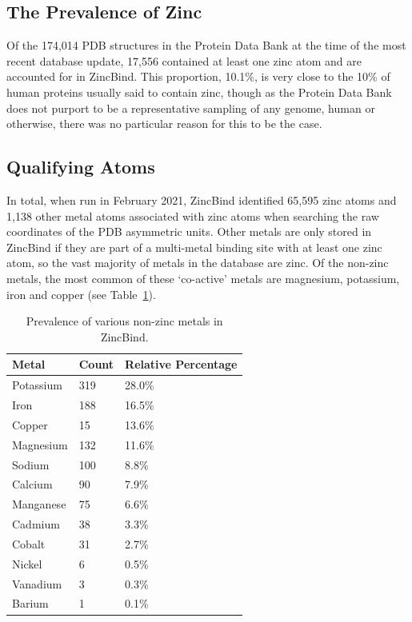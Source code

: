 \subsection{The Prevalence of Zinc}

Of the 174,014 PDB structures in the Protein Data Bank at the time of the most recent database update, 17,556 contained at least one zinc atom and are accounted for in ZincBind. This proportion, 10.1\%, is very close to the 10\% of human proteins usually said to contain zinc, though as the Protein Data Bank does not purport to be a representative sampling of any genome, human or otherwise, there was no particular reason for this to be the case.

\subsection{Qualifying Atoms}

In total, when run in February 2021, ZincBind identified 65,595 zinc atoms and 1,138 other metal atoms associated with zinc atoms when searching the raw coordinates of the PDB asymmetric units. Other metals are only stored in ZincBind if they are part of a multi-metal binding site with at least one zinc atom, so the vast majority of metals in the database are zinc. Of the non-zinc metals, the most common of these `co-active' metals are magnesium, potassium, iron and copper (see Table~\ref{tab:metalcount}).

\begin{table}
  \caption{\label{tab:metalcount}Prevalence of various non-zinc metals in ZincBind.}
\begin{center}
\begin{tabular}{lll} \hline
Metal & Count & Relative Percentage  \\ \hline
Potassium & 319   & 28.0\% \\
Iron      & 188   & 16.5\% \\
Copper    & 15    & 13.6\% \\
Magnesium & 132   & 11.6\% \\
Sodium    & 100   & 8.8\%  \\ 
Calcium   & 90    & 7.9\%  \\
Manganese & 75    & 6.6\%  \\
Cadmium   & 38    & 3.3\%  \\
Cobalt    & 31    & 2.7\%  \\
Nickel    & 6     & 0.5\%  \\
Vanadium  & 3     & 0.3\%  \\
Barium    & 1     & 0.1\%  \\ \hline
\end{tabular}
\end{center}
\end{table}

